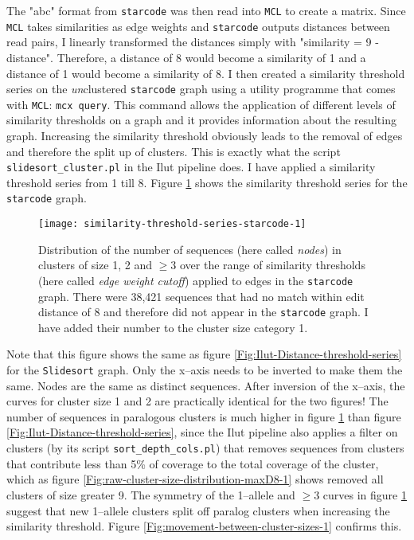 \documentclass{article}\usepackage[]{graphicx}\usepackage[]{color}
\begin{document}
The "abc" format from \texttt{starcode} was then read into \texttt{MCL} to create a matrix. Since \texttt{MCL} takes similarities as edge weights and \texttt{starcode} outputs distances between read pairs, I linearly transformed the distances simply with "similarity = 9 - distance". Therefore, a distance of 8 would become a similarity of 1 and a distance of 1 would become a similarity of 8. I then created a similarity threshold series on the \emph{un}clustered \texttt{starcode} graph using a utility programme that comes with \texttt{MCL}: \texttt{mcx query}. This command allows the application of different levels of similarity thresholds on a graph and it provides information about the resulting graph. Increasing the similarity threshold obviously leads to the removal of edges and therefore the split up of clusters. This is exactly what the script \texttt{slidesort\_cluster.pl} in the Ilut pipeline does. I have applied a similarity threshold series from 1 till 8. Figure \ref{Fig:similarity-threshold-series-starcode-1} shows the similarity threshold series for the \texttt{starcode} graph. 
\begin{figure}[!htb]
\centering
\texttt{[image: similarity-threshold-series-starcode-1]}
\caption{Distribution of the number of sequences (here called \emph{nodes}) in clusters of size 1, 2 and $\ge$3 over the range of similarity thresholds (here called \emph{edge weight cutoff}) applied to edges in the \texttt{starcode} graph. There were 38,421 sequences that had no match within edit distance of 8 and therefore did not appear in the \texttt{starcode} graph. I have added their number to the cluster size category 1.}
\label{Fig:similarity-threshold-series-starcode-1}
\end{figure}
Note that this figure shows the same as figure \ref{Fig:Ilut-Distance-threshold-series} for the \texttt{Slidesort} graph. Only the x--axis needs to be inverted to make them the same. Nodes are the same as distinct sequences. After inversion of the x--axis, the curves for cluster size 1 and 2 are practically identical for the two figures! The number of sequences in paralogous clusters is much higher in figure \ref{Fig:similarity-threshold-series-starcode-1} than figure \ref{Fig:Ilut-Distance-threshold-series}, since the Ilut pipeline also applies a filter on clusters (by its script \texttt{sort\_depth\_cols.pl}) that removes sequences from clusters that contribute less than 5\% of coverage to the total coverage of the cluster, which as figure \ref{Fig:raw-cluster-size-distribution-maxD8-1} shows removed all clusters of size greater 9. The symmetry of the 1--allele and $\ge$3 curves in figure \ref{Fig:similarity-threshold-series-starcode-1} suggest that new 1--allele clusters split off paralog clusters when increasing the similarity threshold. Figure \ref{Fig:movement-between-cluster-sizes-1} confirms this.
\end{document}
